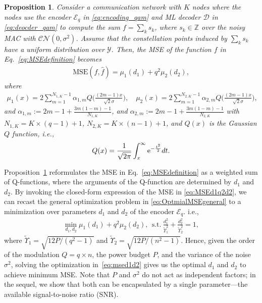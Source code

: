 \documentclass[journal,12pt,onecolumn,draftclsnofoot]{IEEEtran}
\newtheorem{prop}{Proposition}
\theoremstyle{definition}
\begin{document}
\begin{prop}\label{Pr:MSE(1)}\cite[Proposition 1]{Razavikia2024Ring}
    Consider a communication network with $K$ nodes where the nodes use the encoder $\mathscr{E}_q$ in \eqref{eq:encoding_qam} and ML decoder $\mathscr{D}$ in \eqref{eq:deocder_qam} to compute the sum $f = \sum_{k}s_k$, where $s_k\in \mathbb{Z}$ over the noisy MAC with $\mathcal{CN}(0,\sigma^2)$. Assume that the constellation points induced by $\sum_{k}s_k$ have a uniform distribution over $\mathcal{Y}$. Then, the MSE of the function $f$ in Eq.~\eqref{eq:MSEdefinition} becomes  
    \begin{align}
        \label{eq:MSEd1q2d2}
        \text{MSE}(f,\hat{f})  = \mu_1(d_1) + q^2\mu_2(d_2),
    \end{align}
    where
    \begin{align}
\label{eq:mu_definiation}
         \mu_1(x) =  2    \sum_{m=1}^{N_{1,K}-1}\alpha_{1,m}  Q\Big(\frac{(2m-1)x}{\sqrt{2}\sigma}\Big), \quad \mu_2(x) =  2    \sum_{m=1}^{N_{2,K}-1}\alpha_{2,m}  Q\Big(\frac{(2m-1)x}{\sqrt{2}\sigma}\Big),
    \end{align}
      and $\alpha_{1,m} := 2m -1 + \frac{3m(1-m)-1}{N_{1,K}}$, and $\alpha_{2,m} := 2m -1 + \frac{3m(1-m)-1}{N_{2,K}}$ with $N_{1,K}=K \times (q-1)+1$, $N_{2,K}=K \times (n-1)+1$, and $Q(x)$ is the Gaussian $Q$ function, i.e., 
\begin{align}
    Q(x)  = \frac{1}{\sqrt{2\pi}}\int_{x}^{\infty}{\rm e}^{-\frac{t^2}{2}}dt.
\end{align}
\end{prop}
Proposition~\ref{Pr:MSE(1)} reformulates the MSE in Eq.~\eqref{eq:MSEdefinition} as a weighted sum of Q-functions, where the arguments of the Q-function are determined by $d_1$ and $d_2$. By invoking the closed-form expression of the MSE in \eqref{eq:MSEd1q2d2}, we can recast the general optimization problem in \eqref{eq:OptmialMSEgeneral} to a minimization over parameters $d_1$ and $d_2$ of the encoder $\mathscr{E}_q$. i.e.,   
\begin{align}
\min_{d_1,d_2} \mu_1(d_1)+ q^2\mu_2(d_2),~~\text{s.t.}~ \frac{d_1^2}{\tilde{\Upsilon}_1^2} + \frac{d_2^2}{\tilde{\Upsilon}_2^2} = 1,  \label{eq:msed1d2}
\end{align}
where $\tilde{\Upsilon}_1 = \sqrt{12P/(q^2-1)}$ and $\tilde{\Upsilon}_2 = \sqrt{12P/(n^2-1)}$. Hence, given the order of the modulation $Q= q\times n$, the power budget $P$, and the variance of the noise $\sigma^2$, solving the optimization in~\eqref{eq:msed1d2} gives us the optimal $d_1$ and $d_2$  to achieve minimum MSE. Note that $P$ and $\sigma^2$ do not act as independent factors; in the sequel, we show that both can be encapsulated by a single parameter—the available signal-to-noise ratio (SNR). 
\end{document}
